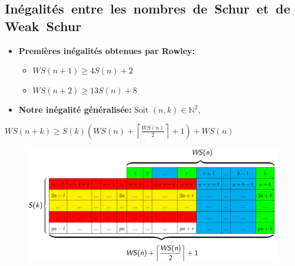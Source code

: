 \documentclass[graphics]{beamer}
\begin{document}
\subsection{Inégalités~entre~les~nombres~de~Schur~et~de~Weak~Schur}


\begin{frame}
	\begin{itemize}
		\item \textbf{Premières inégalités obtenues par Rowley:}
		\vspace{3 mm}
			\begin{itemize}
			\item $WS(n+1) \geqslant 4S(n)+2$
			\item $WS(n+2) \geqslant 13S(n)+8$
			\end{itemize}
		\vspace{5 mm}
		\item \textbf{Notre inégalité généralisée:} 
		\vspace{5 mm} Soit $(n,k) \in \mathbb{N}^2$,
	\end{itemize}
\end{frame}

\begin{frame}
\begin{center}
$WS (n+k) \geqslant S(k) \left (WS (n) +\left \lceil \displaystyle \frac{WS (n)}{2}
			\right \rceil +1 \right) + WS (n)$
\end{center}

\begin{figure}
        \centering
        \includegraphics[scale=0.7]{tableau.png}
\end{figure}
\end{frame}
\end{document}
